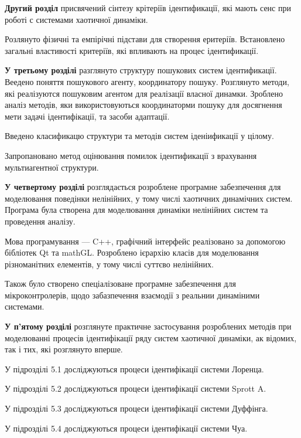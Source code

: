 \documentclass[a4paper,12pt]{atuaref}
\begin{document}
\textbf{Другий розділ}
присвячений
сінтезу крітеріїв ідентификації,
які мають сенс при роботі с системами
хаотичної динаміки.

Розлянуто фізичні та емпірічні підстави для створення
еритеріїв. Встановлено
загальні властивості критеріїв,
які впливають на процес ідентификації.





\medskip

\textbf{У третьому розділі}
разглянуто структуру пошукових систем
ідентификації.
Веедено поняття пошукового агенту,
координатору пошуку.
Розглянуто методи,
які реалізуются пошуковим агентом для
реалізації власної динамки.
Зроблено аналіз методів, яки використовуються
координаторми пошуку для досягнення мети
задачі ідентифікації, та засоби адаптації.

Введено класификацю структури та методів систем іденіификації у цілому.

Запропановано метод оцінювання помилок ідентификації
з врахування мультиагентної структури.





\textbf{У четвертому розділі} розглядається розроблене програмне
забезпечення
для моделювання
поведінки  нелінійних,
у тому числі хаотичних динамічних систем.
Програма була створена для моделювання динаміки
нелінійних систем та проведення аналізу.

Мова програмування --- C++,
графічний інтерфейс реалізовано за допомогою
бібліотек Qt та mathGL.
Розроблено ієрархію класів для
моделювання різноманітних елементів,
у тому числі суттєво нелінійних.

Також було створено спеціалізоване
програмне забезпечення для мікроконтролерів,
щодо забазпечення взаємодії
з реальнии динаміними системами.




\textbf{У п'ятому розділі}
розглянуте практичне застосування розроблених методів при моделюванні
процесів ідентифікації ряду систем хаотичної динаміки,
ак відомих, так і тих, які розглянуто вперше.

У підрозділі 5.1 досліджуються процеси ідентифікації системи Лоренца.

У підрозділі 5.2 досліджуються процеси ідентифікації системи Sprott A.

У підрозділі 5.3 досліджуються процеси ідентифікації системи Дуффінга.

У підрозділі 5.4 досліджуються процеси ідентифікації системи Чуа.
\end{document}
